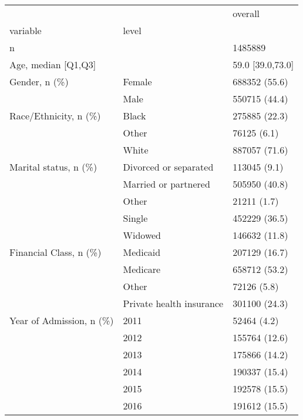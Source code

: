 \begin{tabular}{lll}
\toprule
                                       &   &            overall \\
variable & level &                    \\
\midrule
n &   &            1485889 \\
Age, median [Q1,Q3] &   &   59.0 [39.0,73.0] \\
Gender, n (\%) & Female &      688352 (55.6) \\
                                       & Male &      550715 (44.4) \\
Race/Ethnicity, n (\%) & Black &      275885 (22.3) \\
                                       & Other &        76125 (6.1) \\
                                       & White &      887057 (71.6) \\
Marital status, n (\%) & Divorced or separated &       113045 (9.1) \\
                                       & Married or partnered &      505950 (40.8) \\
                                       & Other &        21211 (1.7) \\
                                       & Single &      452229 (36.5) \\
                                       & Widowed &      146632 (11.8) \\
Financial Class, n (\%) & Medicaid &      207129 (16.7) \\
                                       & Medicare &      658712 (53.2) \\
                                       & Other &        72126 (5.8) \\
                                       & Private health insurance &      301100 (24.3) \\
Year of Admission, n (\%) & 2011 &        52464 (4.2) \\
                                       & 2012 &      155764 (12.6) \\
                                       & 2013 &      175866 (14.2) \\
                                       & 2014 &      190337 (15.4) \\
                                       & 2015 &      192578 (15.5) \\
                                       & 2016 &      191612 (15.5) \\

\end{tabular}
